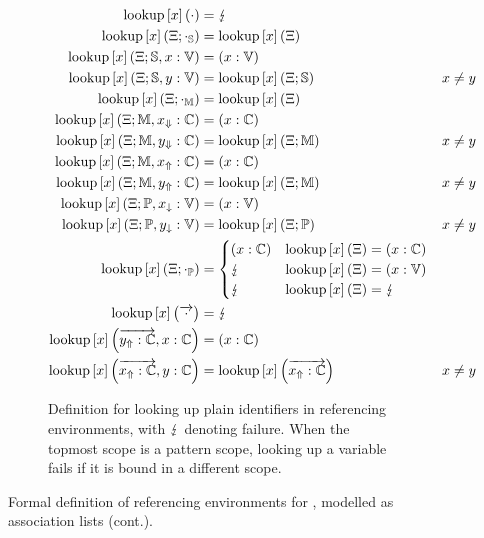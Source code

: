 \begin{figure}[htb]
\begin{subfigure}{\linewidth}
\begin{equation*}
\begin{aligned}
\Lookup{x}{\cdot} &= \Fail\\
\Lookup{x}{\Env; \cdot_\Scope} &= \Lookup{x}{\Env}\\
\Lookup{x}{\Env; \Scope, x : \Var} &= (x : \Var)\\
\Lookup{x}{\Env; \Scope, y : \Var} &= \Lookup{x}{\Env; \Scope} & x \neq y\\
\Lookup{x}{\Env; \cdot_\Module} &= \Lookup{x}{\Env}\\
\Lookup{x}{\Env; \Module, \Private{x} : \Constant} &= (x : \Constant)\\
\Lookup{x}{\Env; \Module, \Private{y} : \Constant} &= \Lookup{x}{\Env; \Module} & x \neq y\\
\Lookup{x}{\Env; \Module, \Public{x} : \Constant} &= (x : \Constant)\\
\Lookup{x}{\Env; \Module, \Public{y} : \Constant} &= \Lookup{x}{\Env; \Module} & x \neq y\\
\Lookup{x}{\Env; \Pattern, \private{x} : \Var} &= (x : \Var)\\
\Lookup{x}{\Env; \Pattern, \private{y} : \Var} &= \Lookup{x}{\Env; \Pattern} & x \neq y\\
\Lookup{x}{\Xi; \cdot_\Pattern} &= \begin{cases}
(x : \Constant) & \Lookup{x}{\Xi} = (x : \Constant)\\
\Fail & \Lookup{x}{\Xi} = (x : \Var)\\
\Fail & \Lookup{x}{\Xi} = \Fail
\end{cases}\\
\Lookup{x}{\overrightarrow{\cdot}} &= \Fail\\
\Lookup{x}{\overrightarrow{\Public{y} : \Constant}, x : \Constant} &= (x : \Constant)\\
\Lookup{x}{\overrightarrow{\Public{x} : \Constant}, y : \Constant} &= \Lookup{x}{\overrightarrow{\Public{x} : \Constant}} & x \neq y
\end{aligned}
\end{equation*}
\caption{%
Definition for looking up plain identifiers in referencing environments, with $\Fail$ denoting failure.
When the topmost scope is a pattern scope, looking up a variable fails if it is bound in a different scope.
}
\end{subfigure}
\caption[]{%
Formal definition of referencing environments for \Beluga, modelled as association lists (cont.).
}
\label{figure:definition-lookup-formal}
\end{figure}

